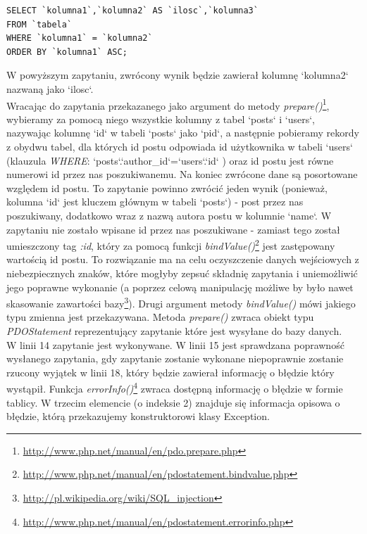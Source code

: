 \documentclass[a4paper,10pt]{article}
\begin{document}
\begin{verbatim}
SELECT `kolumna1`,`kolumna2` AS `ilosc`,`kolumna3`
FROM `tabela`
WHERE `kolumna1` = `kolumna2`
ORDER BY `kolumna1` ASC;
\end{verbatim}
W powyższym zapytaniu, zwrócony wynik będzie zawierał kolumnę `kolumna2` nazwaną jako `ilosc`. \\
Wracając do zapytania przekazanego jako argument do metody \textit{prepare()}\footnote{\href{http://www.php.net/manual/en/pdo.prepare.php}{http://www.php.net/manual/en/pdo.prepare.php}}, wybieramy za pomocą niego wszystkie kolumny z tabel `posts` i `users`, nazywając kolumnę `id` w tabeli `posts` jako `pid`, a następnie pobieramy rekordy z obydwu tabel, dla których id postu odpowiada id użytkownika w tabeli `users` (klauzula \textit{WHERE}: `posts`.`author\_id`=`users`.`id` ) oraz id postu jest równe numerowi id przez nas poszukiwanemu. Na koniec zwrócone dane są posortowane względem id postu. To zapytanie powinno zwrócić jeden wynik (ponieważ, kolumna `id` jest kluczem głównym w tabeli `posts`) - post przez nas poszukiwany, dodatkowo wraz z nazwą autora postu w kolumnie `name`. W zapytaniu nie zostało wpisane id przez nas poszukiwane - zamiast tego został umieszczony tag \textit{:id}, który za pomocą funkcji \textit{bindValue()}\footnote{\href{http://www.php.net/manual/en/pdostatement.bindvalue.php}{http://www.php.net/manual/en/pdostatement.bindvalue.php}} jest zastępowany wartością id postu. To rozwiązanie ma na celu oczyszczenie danych wejściowych z niebezpiecznych znaków, które mogłyby zepsuć składnię zapytania i uniemożliwić jego poprawne wykonanie (a poprzez celową manipulację możliwe by było nawet skasowanie zawartości bazy\footnote{\href{http://pl.wikipedia.org/wiki/SQL_injection}{http://pl.wikipedia.org/wiki/SQL\_injection}}). Drugi argument metody \textit{bindValue()} mówi jakiego typu zmienna jest przekazywana. Metoda \textit{prepare()} zwraca obiekt typu \textit{PDOStatement} reprezentujący zapytanie które jest wysyłane do bazy danych. \\
W linii 14 zapytanie jest wykonywane. W linii 15 jest sprawdzana poprawność wysłanego zapytania, gdy zapytanie zostanie wykonane niepoprawnie zostanie rzucony wyjątek w linii 18, który będzie zawierał informację o błędzie który wystąpił. Funkcja \textit{errorInfo()}\footnote{\href{http://www.php.net/manual/en/pdostatement.errorinfo.php}{http://www.php.net/manual/en/pdostatement.errorinfo.php}} zwraca dostępną informację o błędzie w formie tablicy. W trzecim elemencie (o indeksie 2) znajduje się informacja opisowa o błędzie, którą przekazujemy konstruktorowi klasy Exception. \\
\end{document}
